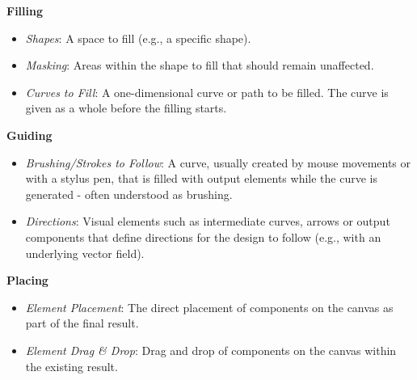 \noindent\textbf{Filling}

\begin{itemize}
    \item \textit{Shapes}: A space to fill (e.g., a specific shape).
    \item \textit{Masking}: Areas within the shape to fill that should remain unaffected.
    \item \textit{Curves to Fill}: A one-dimensional curve or path to be filled. The curve is given as a whole before the filling starts.
\end{itemize}

\noindent\textbf{Guiding}

\begin{itemize}
    \item \textit{Brushing/Strokes to Follow}: A curve, usually created by mouse movements or with a stylus pen, that is filled with output elements while the curve is generated - often understood as brushing.
    \item \textit{Directions}: Visual elements such as intermediate curves, arrows or output components that define directions for the design to follow (e.g., with an underlying vector field).
\end{itemize}

\noindent\textbf{Placing}

\begin{itemize}
    \item \textit{Element Placement}: The direct placement of components on the canvas as part of the final result.
    \item \textit{Element Drag \& Drop}: Drag and drop of components on the canvas within the existing result.
\end{itemize}

